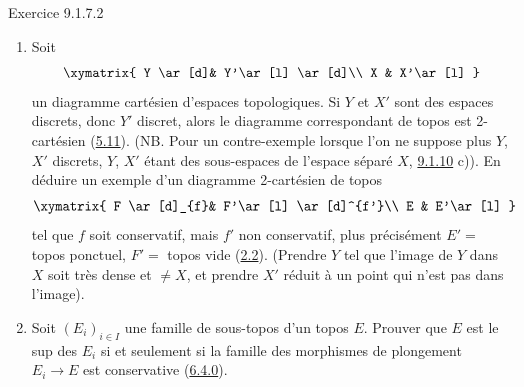 \begin{enonce*}[remark]{Exercice 9.1.7.2}
\begin{enumerate}
\item Soit\pageoriginale
\[
\xymatrix{
Y \ar[d]& Y'\ar[l] \ar[d]\\
X & X'\ar[l] }
\]
un diagramme cartésien d'espaces topologiques. Si $Y$ et $X'$ sont
des espaces discrets, donc $Y'$ discret, alors le diagramme
correspondant de topos est 2-cartésien (\hyperref[IV.prop5.11]{5.11}). (NB.
Pour un contre-exemple lorsque l'on ne suppose plus $Y$, $X'$
discrets, $Y$, $X'$ étant des sous-espaces de l'espace séparé $X$,
\cf \hyperref[IV.exer9.1.10]{9.1.10} c)). En déduire un exemple d'un diagramme
2-cartésien de topos
\[
\xymatrix{
F \ar[d]_{f}& F'\ar[l] \ar[d]^{f'}\\
E & E'\ar[l] }
\]
tel que $f$ soit conservatif, mais $f'$ non conservatif, plus
précisément $E'=$ topos ponctuel, $F'=$ topos vide
(\hyperref[IV.subsec2.2]{2.2}). (Prendre $Y$ tel que l'image de $Y$ dans $X$
soit très dense et $\neq X$, et prendre $X'$ réduit à un point qui
n'est pas dans l'image).

\item Soit $(E_i)_{i\in I}$ une famille de sous-topos d'un topos
$E$. Prouver que $E$ est le sup des $E_i$ si et seulement si la
famille des morphismes de plongement $E_i\rightarrow E$ est
conservative (\hyperref[IV.subsubsec6.4.0]{6.4.0}).
\end{enumerate}
\end{enonce*}

